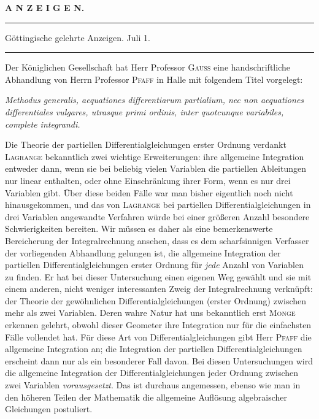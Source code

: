 \clearpage{}
\begin{center}\textbf{A N Z E I G E N.}\par\bigskip
\rule{.85\linewidth}{.4pt}\par
Göttingische gelehrte Anzeigen. Juli 1.\par
\rule{.85\linewidth}{.4pt}\end{center}
Der Königlichen Gesellschaft hat Herr Professor \textsc{Gauss} eine handschriftliche Abhandlung von Herrn Professor \textsc{Pfaff} in Halle mit folgendem Titel vorgelegt:
\begin{center}\textit{Methodus generalis, aequationes differentiarum partialium, nec non aequationes differentiales vulgares, utrasque primi ordinis, inter quotcunque variabiles, complete integrandi.}\end{center}
Die Theorie der partiellen Differentialgleichungen erster Ordnung verdankt \textsc{Lagrange} bekanntlich zwei wichtige Erweiterungen: ihre allgemeine Integration entweder dann, wenn sie bei beliebig vielen Variablen die partiellen Ableitungen nur linear enthalten, oder ohne Einschränkung ihrer Form, wenn es nur drei Variablen gibt. Über diese beiden Fälle war man bisher eigentlich noch nicht hinausgekommen, und das von \textsc{Lagrange} bei partiellen Differentialgleichungen in drei Variablen angewandte Verfahren würde bei einer größeren Anzahl besondere Schwierigkeiten bereiten. Wir müssen es daher als eine bemerkenswerte Bereicherung der Integralrechnung ansehen, dass es dem scharfsinnigen Verfasser der vorliegenden Abhandlung gelungen ist, die allgemeine Integration der partiellen Differentialgleichungen erster Ordnung für \textit{jede} Anzahl von Variablen zu finden. Er hat bei dieser Untersuchung einen eigenen Weg gewählt%
 und sie mit einem anderen, nicht weniger interessanten Zweig der Integralrechnung verknüpft: der Theorie der gewöhnlichen Differentialgleichungen (erster Ordnung) zwischen mehr als zwei Variablen. Deren wahre Natur hat uns bekanntlich erst \textsc{Monge} erkennen gelehrt, obwohl dieser Geometer ihre Integration nur für die einfachsten Fälle vollendet hat. Für diese Art von Differentialgleichungen gibt Herr \textsc{Pfaff} die allgemeine Integration an; die Integration der partiellen Differentialgleichungen erscheint dann nur als ein besonderer Fall davon. Bei diesen Untersuchungen wird die allgemeine Integration der Differentialgleichungen jeder Ordnung zwischen zwei Variablen \textit{vorausgesetzt}. Das ist durchaus angemessen, ebenso wie man in den höheren Teilen der Mathematik die allgemeine Auflösung algebraischer Gleichungen postuliert.

